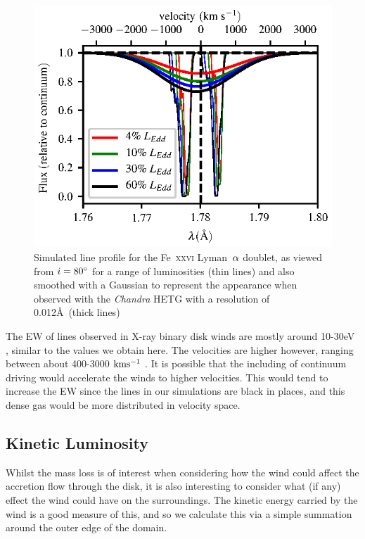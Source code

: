 \documentclass[a4paper,fleqn,usenatbib]{mnras}
\begin{document}
\begin{figure}
\includegraphics[width=\columnwidth]{figures/80_degrees_fe26_smooth.eps}
\caption{Simulated line profile for the Fe~\textsc{xxvi} Lyman~$\rm{\alpha}$
doublet, as viewed from $i = 80\degree$ for a range
of luminosities (thin lines) and also smoothed with a Gaussian to represent the appearance when
observed with the \emph{Chandra} HETG with a resolution of 0.012\AA~(thick lines)}
\label{figure:line26_smooth}
\end{figure}

The EW of lines observed in X-ray binary disk winds are mostly around 10-30eV 
\cite{2012MNRAS.422L..11P}, 
similar to the 
values we obtain here. The velocities are higher however, ranging between about 400-3000 $\rm{kms^{-1}}$
\cite{2016AN....337..368D}. It is possible that the including of continuum driving would accelerate the winds
to higher velocities. This would tend to increase the EW since the lines in our simulations are black in 
places, and this dense gas would be more distributed in velocity space. 


\subsection{Kinetic Luminosity}

Whilst the mass loss is of interest when considering how the wind could affect the 
accretion flow through the disk, it is also interesting to consider what (if any) effect the
wind could have on the surroundings. The kinetic energy carried by the wind is a
good measure of this, and so we calculate this via a simple summation around the outer
edge of the domain. 
\end{document}
